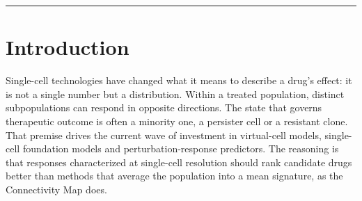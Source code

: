 \documentclass[11pt,letterpaper]{article}
\begin{document}
\begin{abstract}
\noindent
Single-cell drug retrieval is moving from mean signatures to distributional scores over treated populations, and routinely reports large gains under a metric of its own kind. We audit that practice under increasingly independent criteria, and show that mean-signature retrieval is the distributional family's zero-variance limit, not a competitor. Holding rankings, scorer and queries fixed and changing only the judge, distributional retrieval is decisively ahead under objective-aligned metrics, reverses under mechanism recovery, and beats its incumbent against one construction of an external functional oracle, where a scalar comparing no distributions reproduces most of it. Even blind external oracles reverse the winner by statistical form. We formalize when cell-level structure can pay off as two gates, differential response and recoverability; in patient tumours nobody constructed both open, yet the mean already ranks most of what a subpopulation does. Distributional information here is real, and much smaller than objective-aligned evaluation makes it appear.
\end{abstract}

\bigskip\noindent\rule{\textwidth}{0.4pt}\bigskip

\section*{Introduction}

Single-cell technologies have changed what it means to describe a drug's effect: it is not a single number but a distribution. Within a treated population, distinct subpopulations can respond in opposite directions. The state that governs therapeutic outcome is often a minority one, a persister cell or a resistant clone. That premise drives the current wave of investment in virtual-cell models\cite{AIVirtualCell}, single-cell foundation models\cite{ref7,ref8,ref9} and perturbation-response predictors\cite{ref4,ref5,ref10}. The reasoning is that responses characterized at single-cell resolution should rank candidate drugs better than methods that average the population into a mean signature, as the Connectivity Map does\cite{ref1,ref2}.
\end{document}
